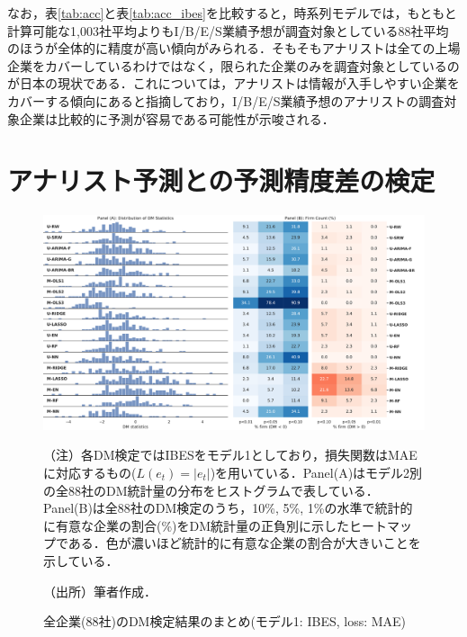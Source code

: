 \documentclass[a4paper，11pt]{jsarticle}
\begin{document}

なお，表\ref{tab:acc}と表\ref{tab:acc_ibes}を比較すると，時系列モデルでは，もともと計算可能な1,003社平均よりもI/B/E/S業績予想が調査対象としている88社平均のほうが全体的に精度が高い傾向がみられる．そもそもアナリストは全ての上場企業をカバーしているわけではなく，限られた企業のみを調査対象としているのが日本の現状である．これについて\cite{nakai2006}は，アナリストは情報が入手しやすい企業をカバーする傾向にあると指摘しており，I/B/E/S業績予想のアナリストの調査対象企業は比較的に予測が容易である可能性が示唆される．

\section{アナリスト予測との予測精度差の検定}

\begin{figure}[tbp]
  \centering
  \caption{全企業(88社)のDM検定結果のまとめ(モデル1: IBES, loss: MAE)}
  \label{fig:dm_ibes_mad}
  \includegraphics[width=\linewidth]{./img/_dm_MAD_y_hat_ibes.pdf}
  \begin{threeparttable}
  \begin{tablenotes}
    \item[]（注）各DM検定ではIBESをモデル1としており，損失関数はMAEに対応するもの($L(e_t)=|e_t|$)を用いている．Panel(A)はモデル2別の全88社のDM統計量の分布をヒストグラムで表している．Panel(B)は全88社のDM検定のうち，10\%, 5\%, 1\%の水準で統計的に有意な企業の割合(\%)をDM統計量の正負別に示したヒートマップである．色が濃いほど統計的に有意な企業の割合が大きいことを示している．
    \item[]（出所）筆者作成．
  \end{tablenotes}
  \end{threeparttable}
\end{figure}
\end{document}
